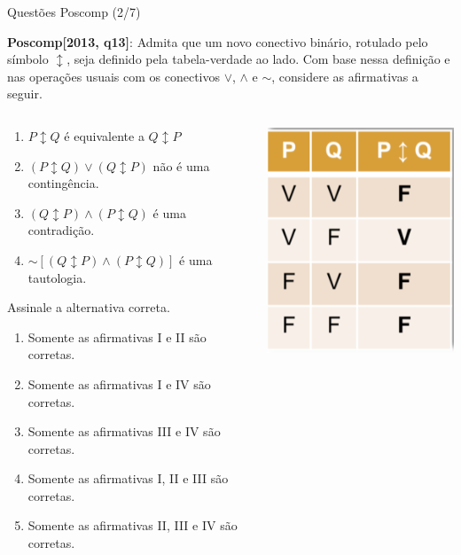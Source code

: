 \documentclass[aspectratio=169]{beamer}
\begin{document}
\begin{frame}{Questões Poscomp (2/7)}

    \textbf{Poscomp[2013, q13]}: Admita que um novo conectivo binário, rotulado pelo símbolo $\updownarrow$, seja definido
    pela tabela-verdade ao lado. Com base nessa definição e nas operações usuais com os conectivos $\vee$, $\wedge$ e $\sim$,
    considere as afirmativas a seguir.

    \begin{columns}
        \begin{column}{0.6\textwidth}
            \begin{enumerate}[I]
                \item $P \updownarrow Q$ é equivalente a $Q \updownarrow P$
                \item $(P \updownarrow Q) \vee (Q \updownarrow P)$ não é uma contingência.
                \item  $(Q \updownarrow P) \wedge (P \updownarrow Q)$ é uma contradição.
                \item  $\sim [(Q \updownarrow P) \wedge (P \updownarrow Q)]$ é uma tautologia.
            \end{enumerate}

            Assinale a alternativa correta.
            \begin{enumerate}[a]
                \item Somente as afirmativas I e II são corretas.
                \item Somente as afirmativas I e IV são corretas.
                \item Somente as afirmativas III e IV são corretas.
                \item Somente as afirmativas I, II e III são corretas.
                \item Somente as afirmativas II, III e IV são corretas.
            \end{enumerate}
        \end{column}
        \begin{column}{0.4\textwidth}  %
            \begin{center}
                \includegraphics[width=.4\linewidth]{figs/tabelaposcomp.png}
            \end{center}
        \end{column}
    \end{columns}

\end{frame}
\end{document}
